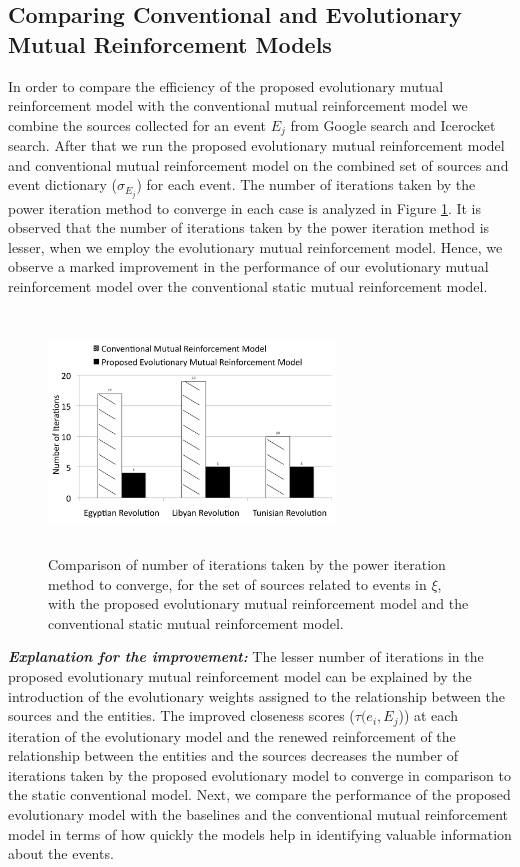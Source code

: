 \subsection{\label{compconvevol}\textbf{Comparing Conventional and Evolutionary Mutual Reinforcement Models}}


In order to compare the efficiency of the proposed evolutionary mutual reinforcement model with the conventional mutual reinforcement model we combine the sources collected for an event $E_{j}$ from Google search and Icerocket search. After that we run the proposed evolutionary mutual reinforcement model and conventional mutual reinforcement model on the combined set of sources and event dictionary ($\sigma_{E_{j}}$) for each event. The number of iterations taken by the power iteration method to converge in each case is analyzed in Figure \ref{fg:figure12}. It is observed that the number of iterations taken by the power iteration method is lesser, when we employ the evolutionary mutual reinforcement model. Hence, we observe a marked improvement in the performance of our evolutionary mutual reinforcement model over the conventional static mutual reinforcement model.

\begin{figure}[htbp]
\centering
\includegraphics[height=2.5in,width=3in]{Figures/Chapter3Figures/Iteration.pdf}

\caption{\small Comparison of number of iterations taken by the power iteration method to converge, for the set of sources related to events in $\xi$, with the proposed evolutionary mutual reinforcement model and the conventional static mutual reinforcement model.}
\label{fg:figure12}

\end{figure}

\noindent \textit{\textbf{Explanation for the improvement:}} The lesser number of iterations in the proposed evolutionary mutual reinforcement model can be explained by the introduction of the evolutionary weights assigned to the relationship between the sources and the entities. The improved closeness scores ($\tau(e_{i},E_{j}$)) at each iteration of the evolutionary model and the renewed reinforcement of the relationship between the entities and the sources decreases the number of iterations taken by the proposed evolutionary model to converge in comparison to the static conventional model. Next, we compare the performance of the proposed evolutionary model with the baselines and the conventional mutual reinforcement model in terms of how quickly the models help in identifying valuable information about the events.

